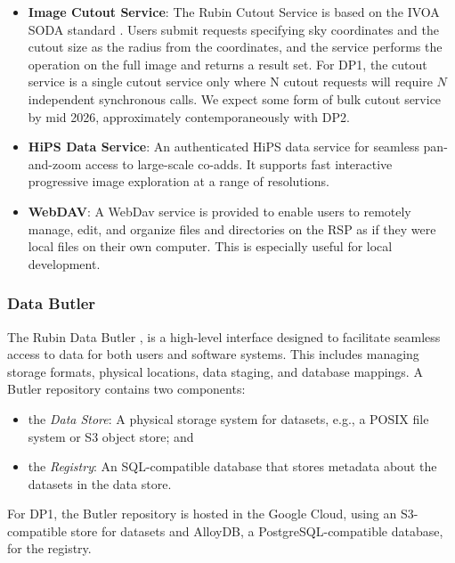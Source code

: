 \begin{itemize}
\vspace{0.1cm}
\item \textbf{Image Cutout Service}: The Rubin Cutout Service \citep{SQR-063, SQR-093} is based on the  IVOA SODA standard \citep{2017ivoa.spec.0517B}.
Users submit requests specifying sky coordinates and the cutout size as the radius from the coordinates, and the  service performs the operation on the full image and returns a result set.
For \gls{DP1}, the  cutout service is a single cutout service only where N cutout requests will require $N$ independent synchronous calls.
We expect some form of bulk cutout service by mid 2026, approximately contemporaneously with \gls{DP2}.

\vspace{0.1cm}
\item \textbf{HiPS Data Service}: An authenticated \gls{HiPS}
\citep{2017ivoa.spec.0519F}
data service for seamless pan-and-zoom access to large-scale co-adds.
It supports fast interactive progressive image exploration at a range of resolutions.

\vspace{0.1cm}
\item \textbf{WebDAV}: A \gls{WebDav} service is provided to enable users to remotely manage, edit, and organize files and directories on the \gls{RSP} as if they were local files on their own computer. This is especially useful for local development.
\end{itemize}

\subsubsection{Data Butler}
\label{sssec:data_butler}

The Rubin Data Butler \citep{2022SPIE12189E..11J,2023arXiv230303313L},  is a high-level interface designed to facilitate seamless access to data for both users and software systems.
This includes managing storage formats, physical locations, data staging, and database mappings.
A \gls{Butler} repository contains two components:
\begin{itemize}
    \item the \emph{Data Store}: A physical storage system for datasets, e.g., a \gls{POSIX} file system or S3 object store; and
    \item the \emph{Registry}: An \gls{SQL}-compatible database that stores metadata about the datasets in the data store.
\end{itemize}
For DP1, the Butler repository is hosted in the Google Cloud, using an \gls{S3}-compatible store for datasets and AlloyDB, a PostgreSQL-compatible database, for the registry.

